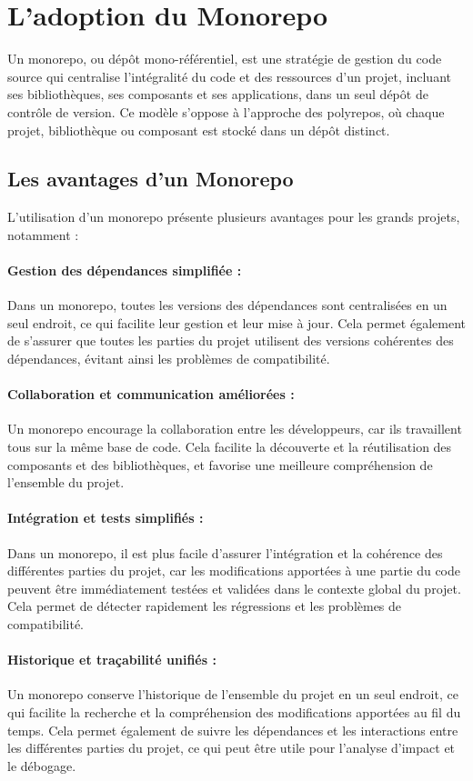 \section{L'adoption du Monorepo}
Un monorepo, ou dépôt mono-référentiel, est une stratégie de gestion du code source qui centralise l'intégralité du code et des ressources d'un projet, incluant ses bibliothèques, ses composants et ses applications, dans un seul dépôt de contrôle de version. Ce modèle s'oppose à l'approche des polyrepos, où chaque projet, bibliothèque ou composant est stocké dans un dépôt distinct.
\subsection{Les avantages d'un Monorepo}

L'utilisation d'un monorepo présente plusieurs avantages pour les grands projets, notamment :

\paragraph{Gestion des dépendances simplifiée :} Dans un monorepo, toutes les versions des dépendances sont centralisées en un seul endroit, ce qui facilite leur gestion et leur mise à jour. Cela permet également de s'assurer que toutes les parties du projet utilisent des versions cohérentes des dépendances, évitant ainsi les problèmes de compatibilité.
\paragraph{Collaboration et communication améliorées :} Un monorepo encourage la collaboration entre les développeurs, car ils travaillent tous sur la même base de code. Cela facilite la découverte et la réutilisation des composants et des bibliothèques, et favorise une meilleure compréhension de l'ensemble du projet.
\paragraph{Intégration et tests simplifiés :} Dans un monorepo, il est plus facile d'assurer l'intégration et la cohérence des différentes parties du projet, car les modifications apportées à une partie du code peuvent être immédiatement testées et validées dans le contexte global du projet. Cela permet de détecter rapidement les régressions et les problèmes de compatibilité.
\paragraph{Historique et traçabilité unifiés :} Un monorepo conserve l'historique de l'ensemble du projet en un seul endroit, ce qui facilite la recherche et la compréhension des modifications apportées au fil du temps. Cela permet également de suivre les dépendances et les interactions entre les différentes parties du projet, ce qui peut être utile pour l'analyse d'impact et le débogage.

